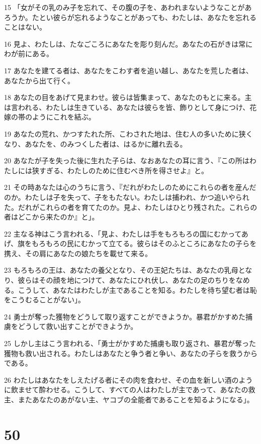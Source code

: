 \par 15 「女がその乳のみ子を忘れて、その腹の子を、あわれまないようなことがあろうか。たとい彼らが忘れるようなことがあっても、わたしは、あなたを忘れることはない。
\par 16 見よ、わたしは、たなごころにあなたを彫り刻んだ。あなたの石がきは常にわが前にある。
\par 17 あなたを建てる者は、あなたをこわす者を追い越し、あなたを荒した者は、あなたから出て行く。
\par 18 あなたの目をあげて見まわせ。彼らは皆集まって、あなたのもとに来る。主は言われる、わたしは生きている、あなたは彼らを皆、飾りとして身につけ、花嫁の帯のようにこれを結ぶ。
\par 19 あなたの荒れ、かつすたれた所、こわされた地は、住む人の多いために狭くなり、あなたを、のみつくした者は、はるかに離れ去る。
\par 20 あなたが子を失った後に生れた子らは、なおあなたの耳に言う、『この所はわたしには狭すぎる、わたしのために住むべき所を得させよ』と。
\par 21 その時あなたは心のうちに言う、『だれがわたしのためにこれらの者を産んだのか。わたしは子を失って、子をもたない。わたしは捕われ、かつ追いやられた。だれがこれらの者を育てたのか。見よ、わたしはひとり残された。これらの者はどこから来たのか』と」。
\par 22 主なる神はこう言われる、「見よ、わたしは手をもろもろの国にむかってあげ、旗をもろもろの民にむかって立てる。彼らはそのふところにあなたの子らを携え、その肩にあなたの娘たちを載せて来る。
\par 23 もろもろの王は、あなたの養父となり、その王妃たちは、あなたの乳母となり、彼らはその顔を地につけて、あなたにひれ伏し、あなたの足のちりをなめる。こうして、あなたはわたしが主であることを知る。わたしを待ち望む者は恥をこうむることがない」。
\par 24 勇士が奪った獲物をどうして取り返すことができようか。暴君がかすめた捕虜をどうして救い出すことができようか。
\par 25 しかし主はこう言われる、「勇士がかすめた捕虜も取り返され、暴君が奪った獲物も救い出される。わたしはあなたと争う者と争い、あなたの子らを救うからである。
\par 26 わたしはあなたをしえたげる者にその肉を食わせ、その血を新しい酒のように飲ませて酔わせる。こうして、すべての人はわたしが主であって、あなたの救主、またあなたのあがない主、ヤコブの全能者であることを知るようになる」。

\chapter{50}

